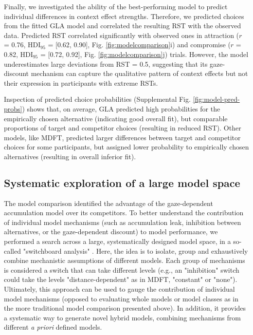 \documentclass[11pt, a4paper]{article}
\begin{document}
Finally, we investigated the ability of the best-performing model to predict individual differences in context effect strengths. Therefore, we predicted choices from the fitted GLA model and correlated the resulting RST with the observed data. Predicted RST correlated significantly with observed ones in attraction ($r$ = 0.76, HDI$_{95}$ = [0.62, 0.90], Fig. \ref{fig:modelcomparison}i) and compromise ($r$ = 0.82, HDI$_{95}$ = [0.72, 0.92], Fig. \ref{fig:modelcomparison}j) trials. However, the model underestimates large deviations from RST = 0.5, suggesting that its gaze-discount mechanism can capture the qualitative pattern of context effects but not their expression in participants with extreme RSTs. 

Inspection of predicted choice probabilities (Supplemental Fig. \ref{fig:model-pred-probs}) shows that, on average, GLA predicted high probabilities for the empirically chosen alternative (indicating good overall fit), but comparable proportions of target and competitor choices (resulting in reduced RST). Other models, like MDFT, predicted larger differences between target and competitor choices for some participants, but assigned lower probability to empirically chosen alternatives (resulting in overall inferior fit).

\subsection*{Systematic exploration of a large model space}

The model comparison identified the advantage of the gaze-dependent accumulation model over its competitors. To better understand the contribution of individual model mechanisms (such as accumulation leak, inhibition between alternatives, or the gaze-dependent discount) to model performance, we performed a search across a large, systematically designed model space, in a so-called "switchboard analysis" \autocite{turner2018CompetingTheoriesMultialternative}. Here, the idea is to isolate, group and exhaustively combine mechanistic assumptions of different models. Each group of mechanisms is considered a switch that can take different levels (e.g., an "inhibition" switch could take the levels "distance-dependent" as in MDFT, "constant" or "none"). Ultimately, this approach can be used to gauge the contribution of individual model mechanisms (opposed to evaluating whole models or model classes as in the more traditional model comparison presented above). In addition, it provides a systematic way to generate novel hybrid models, combining mechanisms from different \emph{a priori} defined models.
\end{document}
